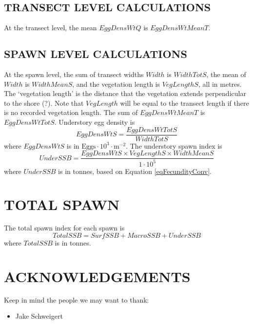 \documentclass[12pt]{article}
\begin{document}
\subsection{TRANSECT LEVEL CALCULATIONS}

At the transect level, the mean $EggDensWtQ$ is $EggDensWtMeanT$.

\subsection{SPAWN LEVEL CALCULATIONS}

At the spawn level, the sum of transect widths $Width$ is $WidthTotS$, the mean of $Width$ is $WidthMeanS$, and the vegetation length is $VegLengthS$, all in metres.
The `vegetation length' is the distance that the vegetation extends perpendicular to the shore (?).
Note that $VegLength$ will be equal to the transect length if there is no recorded vegetation length.
The sum of $EggDensWtMeanT$ is $EggDensWtTotS$.
Understory egg density is 
\begin{equation}
EggDensWtS = \frac{EggDensWtTotS} {WidthTotS}
\label{eqEggDensityUnder}
\end{equation}
where $EggDensWtS$ is in $\text{Eggs} \cdot 10^{3} \cdot \text{m}^{-2}$.
The understory spawn index is
\begin{equation}
UnderSSB = \frac{EggDensWtS \times VegLengthS \times WidthMeanS} {1 \cdot 10^{5}}
\label{eqBiomassUnder}
\end{equation}
where $UnderSSB$ is in tonnes, based on Equation \ref{eqFecundityConv}.

\section{TOTAL SPAWN}

The total spawn index for each spawn is
\begin{equation}
TotalSSB = SurfSSB + MacroSSB + UnderSSB
\label{eqTotalSSB}
\end{equation}
where $TotalSSB$ is in tonnes.

\section{ACKNOWLEDGEMENTS}

Keep in mind the people we may want to thank:
\begin{itemize}
\item Jake Schweigert
\end{itemize}



\end{document}

